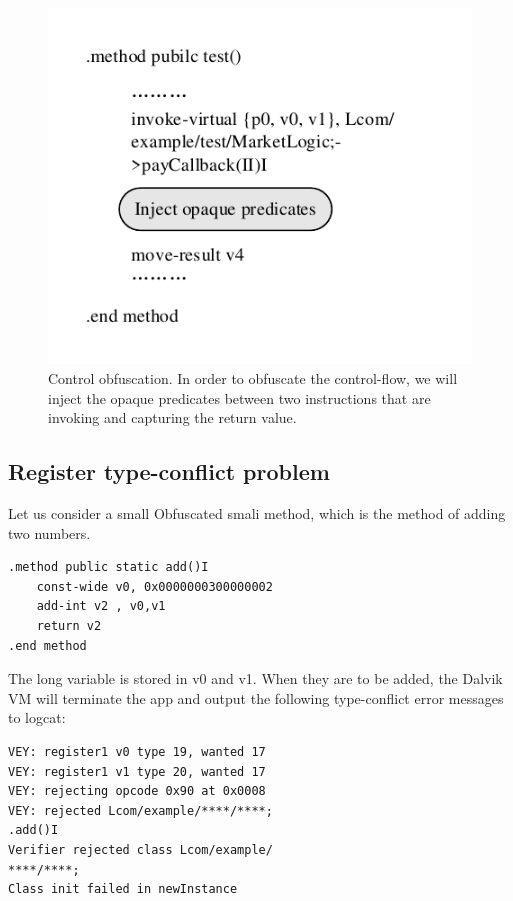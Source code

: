 \begin{figure}[!tbp]
  \centering
  \includegraphics[width=0.8\columnwidth]{fig/fig5.pdf}
  \caption{Control obfuscation. In order to obfuscate the control-flow, we will inject the opaque predicates between two instructions that are invoking and capturing the return value.}\label{fig:Figure 5}
\end{figure}
\subsection{Register type-conflict problem}
Let us consider a small Obfuscated smali method, which is the method of adding two numbers.

\begin{lstlisting}[language={[ANSI]C}, backgroundcolor=\color{backcolour},keywordstyle=\color{blue},commentstyle=\color{red!50!green!50!blue!50}]
.method public static add()I
    const-wide v0, 0x0000000300000002
    add-int v2 , v0,v1
    return v2
.end method

\end{lstlisting}

\noindent The long variable is stored in v0 and v1. When they are to be added, the Dalvik VM will terminate the app and output the following type-conflict error messages to logcat:
\begin{lstlisting}[language={[ANSI]C}, backgroundcolor=\color{backcolour},keywordstyle=\color{blue}]
VEY: register1 v0 type 19, wanted 17
VEY: register1 v1 type 20, wanted 17
VEY: rejecting opcode 0x90 at 0x0008
VEY: rejected Lcom/example/****/****;
.add()I
Verifier rejected class Lcom/example/
****/****;
Class init failed in newInstance

\end{lstlisting}

